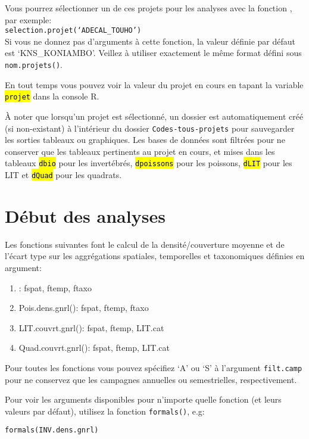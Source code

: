 \documentclass{article}
\begin{document}
Vous pourrez sélectionner un de ces projets pour les analyses avec la
fonction , par exemple:\\

\texttt{selection.projet(`ADECAL\_TOUHO')}\\

Si vous ne donnez pas d'arguments à cette fonction, la valeur définie
par défaut est `KNS\_KONIAMBO'. Veillez à utiliser exactement le même
format défini sous \texttt{nom.projets()}.

En tout temps vous pouvez voir la valeur du projet en cours en tapant
la variable \hl{\texttt{projet}} dans la console R.

À noter que lorsqu'un projet est sélectionné, un dossier est
automatiquement créé (si non-existant) à l'intérieur du dossier
\texttt{Codes-tous-projets} pour sauvegarder les sorties tableaux ou
graphiques. Les bases de données sont filtrées pour ne conserver que
les tableaux pertinents au projet en cours, et mises dans les tableaux
\hl{\texttt{dbio}} pour les invertébrés, \hl{\texttt{dpoissons}} pour les
poissons, \hl{\texttt{dLIT}} pour les LIT et \hl{\texttt{dQuad}} pour les quadrats.

\section{Début des analyses}

Les fonctions suivantes font le calcul de la densité/couverture
moyenne et de l'écart type sur les aggrégations spatiales, temporelles
et taxonomiques définies en argument:
\begin{enumerate}
\item {}: fspat, ftemp, ftaxo
\item Pois.dens.gnrl(): fspat, ftemp, ftaxo
\item LIT.couvrt.gnrl(): fspat, ftemp, LIT.cat
\item Quad.couvrt.gnrl(): fspat, ftemp, LIT.cat
\end{enumerate}

Pour toutes les fonctions vous pouvez spécifiez `A' ou `S' à
l'argument \texttt{filt.camp} pour ne conservez que les campagnes
annuelles ou semestrielles, respectivement.

Pour voir les arguments disponibles pour n'importe quelle fonction (et leurs valeurs
par défaut), utilisez la fonction \texttt{formals()}, e.g:

\texttt{formals(INV.dens.gnrl)}
\end{document}
